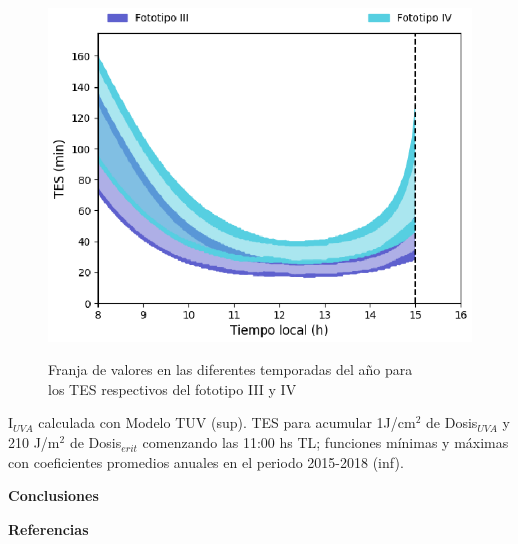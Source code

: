 \documentclass{article}
\begin{document}
\begin{multicols}{2}
\begin{figure}[H]
    \includegraphics[scale=1.3]{images/FillDosis2.eps}
    \label{fig:dosismaxima}
    \centering
    \caption{Franja de valores en las diferentes temporadas del año para \\los TES respectivos del fototipo III y IV }
\end{figure}
\textcolor{na}{I$_{UVA}$ calculada con Modelo TUV (sup). TES para acumular 1J/cm$^2$ de Dosis$_{UVA}$ y 210 J/m$^2$ de Dosis$_{erit}$ comenzando las 11:00 hs TL; funciones mínimas y máximas con coeficientes promedios anuales en el periodo 2015-2018 (inf).}
\changefontsizes{12pt}
\begin{center}
\begin{shaded}
\changefontsizes{12pt}
\textbf{\textcolor{na}{Conclusiones}}
\end{shaded}
\end{center}
\begin{center}
\begin{shaded}
\textbf{\textcolor{na}{Referencias}}
\end{shaded}
\end{center}
\end{multicols}
\end{document}
